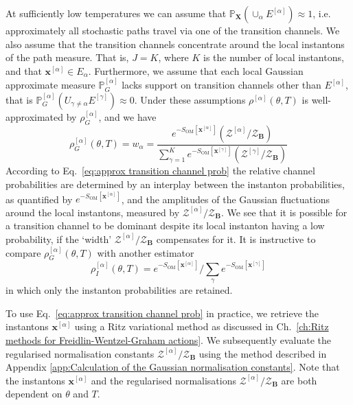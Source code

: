 At sufficiently low temperatures we can assume that $\mathbb{P}_\mathbf{X}(\cup_{\alpha} E^{[\alpha]})\approx 1$, i.e. approximately all stochastic paths travel via one of the
transition channels. We also assume that the transition channels concentrate around the local instantons of the path measure. That is, $J = K$, where $K$ is the number of local instantons, and that $\mathbf{x}^{[\alpha]}\in E_{\alpha}$. Furthermore, we assume that each local Gaussian approximate measure $\mathbb{P}_G^{[\alpha]}$ lacks support on transition channels other than $E^{[\alpha]}$, that is $\mathbb{P}_G^{[\alpha]}(U_{\gamma \neq \alpha} E^{[\gamma]}) \approx 0$. Under these assumptions $\rho^{[\alpha]}(\theta,T)$ is well-approximated by $\rho_G^{[\alpha]}$, and we have
\begin{equation} \label{eq:approx transition channel prob}
\rho_G^{[\alpha]}(\theta,T) = w_{\alpha} = \frac{e^{-S_{\text{OM}}[\mathbf{x}^{[\alpha]}]} (\mathcal{Z}^{[\alpha]} / \mathcal{Z}_\mathbf{B}) }{ \sum_{\gamma=1}^{K}e^{-S_{\text{OM}}[\mathbf{x}^{[\gamma]}]}(\mathcal{Z}^{[\gamma]} / \mathcal{Z}_\mathbf{B}) }
\end{equation}
According to Eq.~\ref{eq:approx transition channel prob} the relative channel probabilities are determined by an interplay between the instanton probabilities, as quantified by $e^{-S_{\text{OM}}[\mathbf{x}^{[\alpha]}]}$, and the amplitudes of the Gaussian fluctuations around the local instantons, measured by $\mathcal{Z}^{[\alpha]}/ \mathcal{Z}_\mathbf{B}$. We see that it is possible for a transition channel to be dominant despite its local instanton having a low probability, if the `width' $\mathcal{Z}^{[\alpha]}/ \mathcal{Z}_\mathbf{B}$ compensates for it. It is instructive to compare $\rho_G^{[\alpha]}(\theta,T)$  with another estimator
\begin{equation}
	\rho_{I}^{[\alpha]}(\theta,T)=e^{-S_{\text{OM}}[\mathbf{x}^{[\alpha]}]}/\sum_{\gamma}e^{-S_{\text{OM}}[\mathbf{x}^{[\gamma]}]}
\end{equation}
in which only the instanton probabilities are retained.

To use Eq.~\ref{eq:approx transition channel prob} in practice, we retrieve the instantons
$\mathbf{x}^{[\alpha]}$ using a Ritz variational method as discussed in Ch.~\ref{ch:Ritz methods for Freidlin-Wentzel-Graham actions}. We subsequently evaluate the regularised normalisation constants $\mathcal{Z}^{[\alpha]} / \mathcal{Z}_\mathbf{B}$ using the method described in Appendix \ref{app:Calculation of the Gaussian normalisation constants}. Note that the instantons $\mathbf{x}^{[\alpha]}$ and the regularised normalisations $\mathcal{Z}^{[\alpha]} / \mathcal{Z}_\mathbf{B}$ are both dependent on $\theta$ and $T$.

